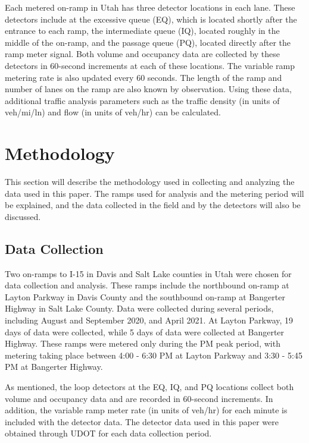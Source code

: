 \documentclass[numbered]{trbarticle}
\begin{document}
Each metered on-ramp in Utah has three detector locations in each lane. These detectors include at the excessive queue (EQ), which is located shortly after the entrance to each ramp, the intermediate queue (IQ), located roughly in the middle of the on-ramp, and the passage queue (PQ), located directly after the ramp meter signal. Both volume and occupancy data are collected by these detectors in 60-second increments at each of these locations. The variable ramp metering rate is also updated every 60 seconds. The length of the ramp and number of lanes on the ramp are also known by observation. Using these data, additional traffic analysis parameters such as the traffic density (in units of veh/mi/ln) and flow (in units of veh/hr) can be calculated.

\hypertarget{methodology}{%
\section{Methodology}\label{methodology}}

This section will describe the methodology used in collecting and analyzing the data used in this paper. The ramps used for analysis and the metering period will be explained, and the data collected in the field and by the detectors will also be discussed.

\hypertarget{data-collection}{%
\subsection{Data Collection}\label{data-collection}}

Two on-ramps to I-15 in Davis and Salt Lake counties in Utah were chosen for data collection and analysis. These ramps include the northbound on-ramp at Layton Parkway in Davis County and the southbound on-ramp at Bangerter Highway in Salt Lake County. Data were collected during several periods, including August and September 2020, and April 2021. At Layton Parkway, 19 days of data were collected, while 5 days of data were collected at Bangerter Highway. These ramps were metered only during the PM peak period, with metering taking place between 4:00 - 6:30 PM at Layton Parkway and 3:30 - 5:45 PM at Bangerter Highway.

As mentioned, the loop detectors at the EQ, IQ, and PQ locations collect both volume and occupancy data and are recorded in 60-second increments. In addition, the variable ramp meter rate (in units of veh/hr) for each minute is included with the detector data. The detector data used in this paper were obtained through UDOT for each data collection period.
\end{document}
